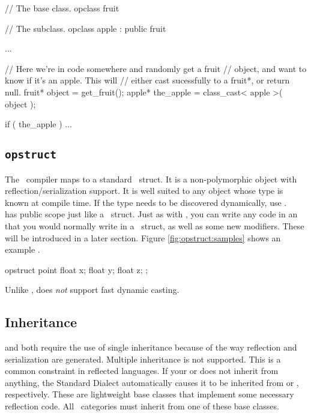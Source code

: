 \begin{opcpp}[label={fig:opclass:classcast},caption={Using the \opcppk{class_cast} operator.}]
// The base class.
opclass fruit
{

}

// The subclass.
opclass apple : public fruit
{

}

...

// Here we're in code somewhere and randomly get a fruit
// object, and want to know if it's an apple.  This will
// either cast sucessfully to a fruit*, or return null.
fruit* object    = get_fruit();
apple* the_apple = class_cast< apple >( object );

if ( the_apple )
    ...
\end{opcpp}

\subsection{{\tt opstruct}}
\label{subsec:opstruct}

The \opCPP\ compiler maps  to a standard \cpp\ struct.  It is a non-polymorphic object with reflection/serialization support.  It is well suited to any object whose type is known at compile time.  If the type needs to be discovered dynamically, use .  \\

 has public scope just like a \cpp\ struct.  Just as with , you can write any code in an  that you would normally write in a \cpp\ struct, as well as some new modifiers.  These will be introduced in a later section.  Figure \ref{fig:opstruct:samples} shows an example . \\

\begin{opcpp}[label={fig:opstruct:samples},caption={Using a simple \opcppk{opstruct}.}]
opstruct point
{
	float x;
	float y;
	float z;
};
\end{opcpp}

Unlike ,  does \textit{not} support fast dynamic casting.

\subsection{Inheritance}
\label{subsec:categories:inheritance}

 and  both require the use of single inheritance because of the way reflection and serialization are generated.  Multiple inheritance is not supported.  This is a common constraint in reflected languages.  If your  or  does not inherit from anything, the Standard Dialect automatically causes it to be inherited from  or , respectively.  These are lightweight base classes that implement some necessary reflection code.  All \opCPP\ categories must inherit from one of these base classes. \\

